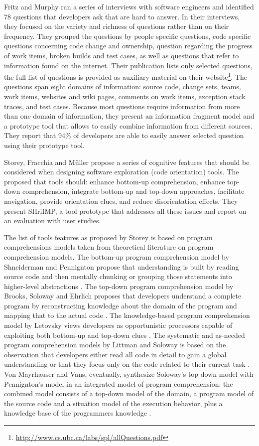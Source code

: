 Fritz and Murphy \cite{Frit10a} ran a series of interviews with software engineers and identified 78 questions that developers ask that are hard to answer. In their interviews, they focused on the variety and richness of questions rather than on their frequency. They grouped the questions by people specific questions, code specific questions concerning code change and ownership, question regarding the progress of work items, broken builds and test cases, as well as questions that refer to information found on the internet. Their publication lists only selected questions, the full list of questions is provided as auxiliary material on their website\footnote{\url{http://www.cs.ubc.ca/labs/spl/allQuestions.pdf}}. The questions span eight domains of information: source code, change sets, teams, work items, websites and wiki pages, comments on work items, exception stack traces, and test cases. Because most questions require information from more than one domain of information, they present an information fragment model and a prototype tool that allows to easily combine information from different sources. They report that 94\% of developers are able to easily answer selected question using their prototype tool.

Storey, Fracchia and M\"uller \cite{Stor99a} propose a series of cognitive features that should be considered when designing software exploration (\ie code orientation) tools. The proposed that tools should: enhance bottom-up comprehension, enhance top-down comprehension, integrate bottom-up and top-down approaches, facilitate navigation, provide orientation clues, and reduce disorientation effects. They present SHriIMP, a tool prototype that addresses all these issues and report on an evaluation with user studies. 

The list of tools features as proposed by Storey \etal is based on program comprehensions models taken from theoretical literature on program comprehension models.
%
The bottom-up program comprehension model by Shneiderman and Pennignton propose that understanding is built by reading source code and then mentally chunking  or grouping those statements into higher-level abstractions \cite{Shne80a,Penn87a}.
%
The top-down program comprehension model by Brooks, Soloway and Ehrlich proposes that developers understand a complete program by reconstructing knowledge about the domain of the program and mapping that to the actual code \cite{Broo83b, Solo84a}. 
% 
The knowledge-based program comprehension model by Letovsky views developers as opportunistic processors capable of exploiting both bottom-up and top-down clues \cite{Leto86a}. 
%
The systematic and as-needed program comprehension models by Littman and Soloway is based on the  observation that developers either read all code in detail to gain a global understanding or that they focus only on the code related to their current task \cite{LittXXx,SoloXXx}.
%
Von Mayrhauser and Vans, eventually, synthesize Soloway's top-down model with Pennignton's model in an integrated model of program comprehension: the combined model consists of a top-down model of the domain, a program model of the source code and a situation model of the execution behavior, plus a knowledge base of the programmers knowledge \cite{MayrXXx}. 

